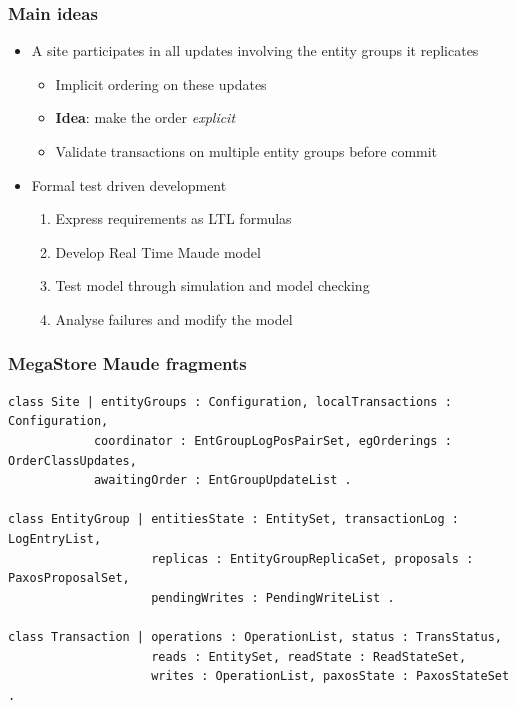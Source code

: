 \documentclass{beamer}
\begin{document}
\begin{frame}
    \frametitle{Main ideas}

    \begin{itemize}
        \item A site participates in all updates involving the entity groups it replicates 
            \begin{itemize}
                \item Implicit ordering on these updates
                \item \textbf{Idea}: make the order \emph{explicit}
                \item Validate transactions on multiple entity groups before commit 
            \end{itemize}
            
        \bigskip
        \pause
        \item Formal test driven development 
            \begin{enumerate}
                \item Express requirements as LTL formulas
                \item Develop Real Time Maude model 
                \item Test model through simulation and model checking 
                \item Analyse failures and modify the model
            \end{enumerate}
    \end{itemize}
\end{frame}
\begin{frame}[fragile]
    \scriptsize
    \frametitle{MegaStore Maude fragments}
    \begin{lstlisting}[language=maude]
class Site | entityGroups : Configuration, localTransactions : Configuration,
            coordinator : EntGroupLogPosPairSet, egOrderings : OrderClassUpdates,
            awaitingOrder : EntGroupUpdateList .

class EntityGroup | entitiesState : EntitySet, transactionLog : LogEntryList,
                    replicas : EntityGroupReplicaSet, proposals : PaxosProposalSet,
                    pendingWrites : PendingWriteList .

class Transaction | operations : OperationList, status : TransStatus,
                    reads : EntitySet, readState : ReadStateSet,
                    writes : OperationList, paxosState : PaxosStateSet .
    \end{lstlisting}
\end{frame}
\end{document}

